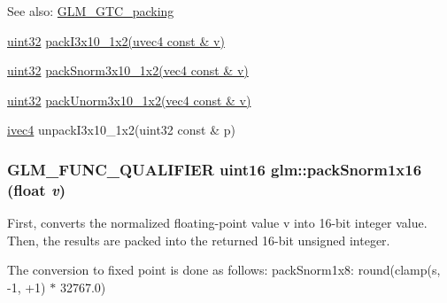 \begin{Desc}
\item[See also:]\hyperlink{group__gtc__packing}{GLM\_\-GTC\_\-packing} 

\hyperlink{group__gtc__type__precision_g202b6a53c105fcb7e531f9b443518451}{uint32} \hyperlink{group__gtc__packing_g032e18fa5bc5b8f3897104aeb2f1e195}{packI3x10\_\-1x2(uvec4 const \& v)} 

\hyperlink{group__gtc__type__precision_g202b6a53c105fcb7e531f9b443518451}{uint32} \hyperlink{group__gtc__packing_g0d4157cec37c0312216a7be1cc92df54}{packSnorm3x10\_\-1x2(vec4 const \& v)} 

\hyperlink{group__gtc__type__precision_g202b6a53c105fcb7e531f9b443518451}{uint32} \hyperlink{group__gtc__packing_g2cf2d11b40bd48639110456fd74c2e33}{packUnorm3x10\_\-1x2(vec4 const \& v)} 

\hyperlink{group__core__types_ga4560ddc50320ea8f8a70d5c9c249fea}{ivec4} unpackI3x10\_\-1x2(uint32 const \& p) \end{Desc}
\hypertarget{group__gtc__packing_gc29411d6c0f6ed0fe9f0396dfe92e0e8}{
\subsubsection[packSnorm1x16]{\setlength{\rightskip}{0pt plus 5cm}GLM\_\-FUNC\_\-QUALIFIER uint16 glm::packSnorm1x16 (float {\em v})}}
\label{group__gtc__packing_gc29411d6c0f6ed0fe9f0396dfe92e0e8}


First, converts the normalized floating-point value v into 16-bit integer value. Then, the results are packed into the returned 16-bit unsigned integer.

The conversion to fixed point is done as follows: packSnorm1x8: round(clamp(s, -1, +1) $\ast$ 32767.0)

